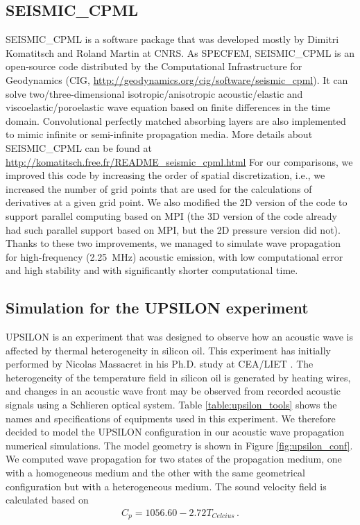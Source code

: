     \subsection{SEISMIC\_CPML}

        SEISMIC\_CPML is a software package that was developed mostly by Dimitri Komatitsch and Roland Martin at CNRS. As SPECFEM,
SEISMIC\_CPML is an open-source code distributed by the Computational Infrastructure for Geodynamics (CIG, \url{http://geodynamics.org/cig/software/seismic_cpml}).
        It can solve two/three-dimensional isotropic/anisotropic acoustic/elastic and viscoelastic/poroelastic wave equation based
on finite differences in the time domain. Convolutional perfectly matched absorbing layers \citep{KoMa07} are also implemented to mimic infinite or semi-infinite propagation media.
More details about SEISMIC\_CPML can be found at \url{http://komatitsch.free.fr/README_seismic_cpml.html}
For our comparisons, we improved this code by increasing the order of spatial discretization, i.e., we increased the number of grid points that are used for the calculations
of derivatives at a given grid point. We also modified the 2D version of the code
to support parallel computing based on MPI (the 3D version of the code already had such parallel support based on MPI, but the 2D pressure version
did not). Thanks to these two improvements, we managed to simulate wave propagation for
high-frequency (\SI{2.25}{\mega\hertz}) acoustic emission, with low computational error and high stability and with significantly shorter computational time.

    \subsection{Simulation for the UPSILON experiment}

        UPSILON is an experiment that was designed to observe how an acoustic wave is affected by thermal heterogeneity in silicon oil.
This experiment has initially performed by Nicolas Massacret in his Ph.D. study at CEA/LIET \citep{Massacret2014Etudedunemethode}.
The heterogeneity of the temperature field in silicon oil is
generated by heating wires, and changes in an acoustic wave front may be observed from recorded acoustic signals using a Schlieren optical system.
Table \ref{table:upsilon_tools} shows the names and specifications of equipments used in this experiment.
        We therefore decided to model the UPSILON configuration in our acoustic wave propagation numerical simulations. The model geometry is shown in Figure \ref{fig:upsilon_conf}.
        We computed wave propagation for two states of the propagation medium, one with a homogeneous medium and the other with the same geometrical configuration but
with a heterogeneous medium. The sound velocity field is calculated based on
\begin{align} \label{eq:2_11_1}
    C_p = 1056.60 - 2.72 T_{Celcius} \, .
\end{align}

